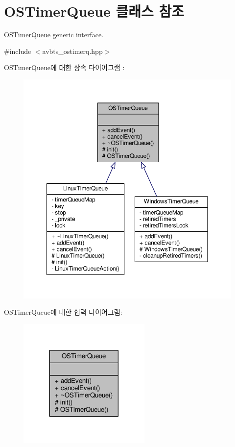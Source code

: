 \hypertarget{class_o_s_timer_queue}{}\section{O\+S\+Timer\+Queue 클래스 참조}
\label{class_o_s_timer_queue}


\hyperlink{class_o_s_timer_queue}{O\+S\+Timer\+Queue} generic interface.  




{\ttfamily \#include $<$avbts\+\_\+ostimerq.\+hpp$>$}



O\+S\+Timer\+Queue에 대한 상속 다이어그램 \+: 
\nopagebreak
\begin{figure}[H]
\begin{center}
\leavevmode
\includegraphics[width=350pt]{class_o_s_timer_queue__inherit__graph}
\end{center}
\end{figure}


O\+S\+Timer\+Queue에 대한 협력 다이어그램\+:
\nopagebreak
\begin{figure}[H]
\begin{center}
\leavevmode
\includegraphics[width=185pt]{class_o_s_timer_queue__coll__graph}
\end{center}
\end{figure}
